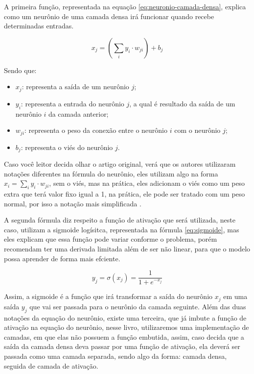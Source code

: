 A primeira função, representada na equação \ref{eq:neuronio-camada-densa}, explica como um neurônio de uma camada densa irá funcionar quando recebe determinadas entradas.

\begin{equation}
    x_j = (\sum_i y_i \cdot w_{ji}) + b_j
    \label{eq:neuronio-camada-densa}
\end{equation}

Sendo que:

\begin{itemize}
    \item $x_j$: representa a saída de um neurônio $j$;
    \item $y_i$: representa a entrada do neurônio $j$, a qual é resultado da saída de um neurônio $i$ da camada anterior;
    \item $w_{ji}$: representa o peso da conexão entre o neurônio $i$ com o neurônio $j$;
    \item $b_j$: representa o viés do neurônio $j$.
\end{itemize}

Caso você leitor decida olhar o artigo original, verá que os autores utilizaram notações diferentes na fórmula do neurônio, eles utilizam algo na forma $x_i = \sum_i y_i \cdot w_{ji}$, sem o viés, mas na prática, eles adicionam o viés como um peso extra que terá valor fixo igual a 1, na prática, ele pode ser tratado com um peso normal, por isso a notação mais simplificada \parencite{BackpropagationArticle}.

A segunda fórmula diz respeito a função de ativação que será utilizada, neste caso, \textcite{BackpropagationArticle} utilizam a sigmoide logísitca, representada na fórmula \ref{eq:sigmoide}, mas eles explicam que essa função pode variar conforme o problema, porém recomendam ter uma derivada limitada além de ser não linear, para que o modelo possa aprender de forma mais efciente.

\begin{equation}
    y_j = \sigma(x_j) = \frac{1}{1 + e^{-x_j}}
    \label{eq:sigmoide}
\end{equation}

Assim, a sigmoide é a função que irá transformar a saída do neurônio $x_j$ em uma saída $y_j$ que vai ser passada para o neurônio da camada seguinte. Além das duas notações da equação do neurônio, existe uma terceira, que já imbute a função de ativação na equação do neurônio, nesse livro, utilizaremos uma implementação de camadas, em que elas não possuem a função embutida, assim, caso decida que a saída da camada densa deva passar por uma função de ativação, ela deverá ser passada como uma camada separada, sendo algo da forma: camada densa, seguida de camada de ativação.

